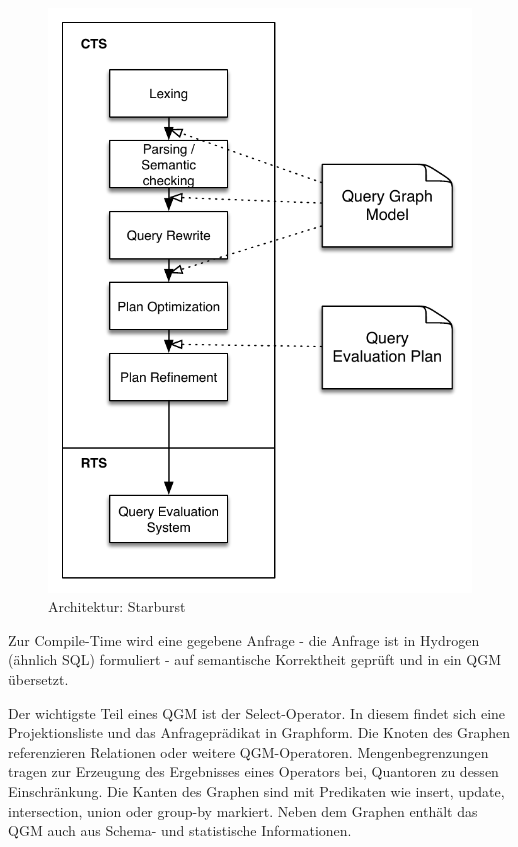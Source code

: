 \begin{figure}[ht]
  \centering
  \includegraphics[scale=0.75]{02_Related_Work/StarburstFlow.pdf}
  \caption{Architektur: Starburst}
  \label{StarburstFlow}
\end{figure}

Zur Compile-Time wird eine gegebene Anfrage - die Anfrage ist in Hydrogen (ähnlich SQL) formuliert - auf semantische Korrektheit geprüft und in ein \ac{QGM} übersetzt.

Der wichtigste Teil eines \ac{QGM} ist der Select-Operator. In diesem findet sich eine Projektionsliste und das Anfrageprädikat in Graphform. Die Knoten des Graphen referenzieren Relationen oder weitere \ac{QGM}-Operatoren. Mengenbegrenzungen   tragen zur Erzeugung des Ergebnisses eines Operators bei, Quantoren zu dessen Einschränkung. Die Kanten des Graphen sind mit Predikaten wie insert, update, intersection, union oder group-by markiert. Neben dem Graphen enthält das \ac{QGM} auch aus Schema- und statistische Informationen. 

